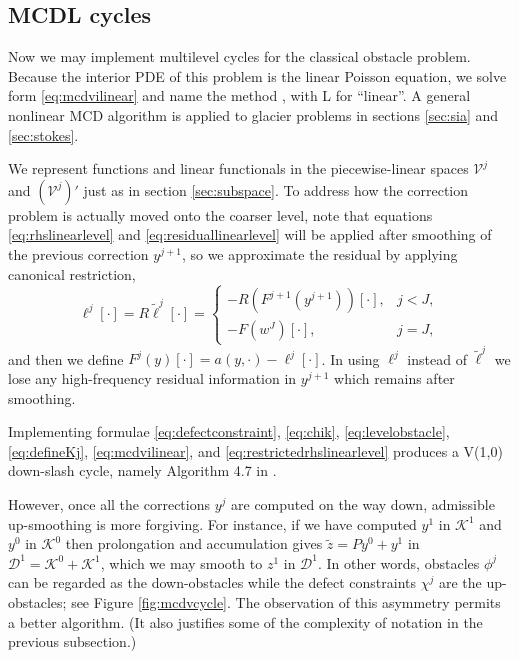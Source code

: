 \documentclass[letterpaper,final,12pt,reqno]{amsart}
\theoremstyle{claim}
\numberwithin{equation}{section}
\numberwithin{figure}{section}
\numberwithin{table}{section}
\numberwithin{theorem}{section}
\begin{document}
\subsection*{MCDL cycles}  Now we may implement multilevel cycles for the classical obstacle problem.  Because the interior PDE of this problem is the linear Poisson equation, we solve form \eqref{eq:mcdvilinear} and name the method , with L for ``linear''.  A general nonlinear MCD algorithm is applied to glacier problems in sections \ref{sec:sia} and \ref{sec:stokes}.

We represent functions and linear functionals in the piecewise-linear spaces $\mathcal{V}^j$ and $(\mathcal{V}^j)'$ just as in section \ref{sec:subspace}.  To address how the correction problem is actually moved onto the coarser level, note that equations \eqref{eq:rhslinearlevel} and \eqref{eq:residuallinearlevel} will be applied after smoothing of the previous correction $y^{j+1}$, so we approximate the residual by applying canonical restriction,
\begin{equation}
\ell^j[\cdot] = R \tilde\ell^j[\cdot] = \begin{cases} - R(F^{j+1}(y^{j+1}))[\cdot], & j < J, \\
                                                      - F(w^J)[\cdot],   & j = J, \end{cases} \label{eq:restrictedrhslinearlevel}
\end{equation}
and then we define $F^j(y)[\cdot] = a(y,\cdot) - \ell^j[\cdot]$.  In using $\ell^j$ instead of $\tilde\ell^j$ we lose any high-frequency residual information in $y^{j+1}$ which remains after smoothing.

Implementing formulae \eqref{eq:defectconstraint}, \eqref{eq:chik}, \eqref{eq:levelobstacle}, \eqref{eq:defineKj}, \eqref{eq:mcdvilinear}, and \eqref{eq:restrictedrhslinearlevel} produces a V(1,0) down-slash cycle, namely Algorithm 4.7 in \cite{GraeserKornhuber2009}.

However, once all the corrections $y^j$ are computed on the way down, admissible up-smoothing is more forgiving.  For instance, if we have computed $y^1$ in $\mathcal{K}^1$ and $y^0$ in $\mathcal{K}^0$ then prolongation and accumulation gives $\tilde z = P y^0 + y^1$ in $\mathcal{D}^1 = \mathcal{K}^0 + \mathcal{K}^1$, which we may smooth to $z^1$ in $\mathcal{D}^1$.  In other words, obstacles $\phi^j$ can be regarded as the down-obstacles while the defect constraints $\chi^j$ are the up-obstacles; see Figure \ref{fig:mcdvcycle}.  The observation of this asymmetry permits a better algorithm.  (It also justifies some of the complexity of notation in the previous subsection.)
\end{document}
